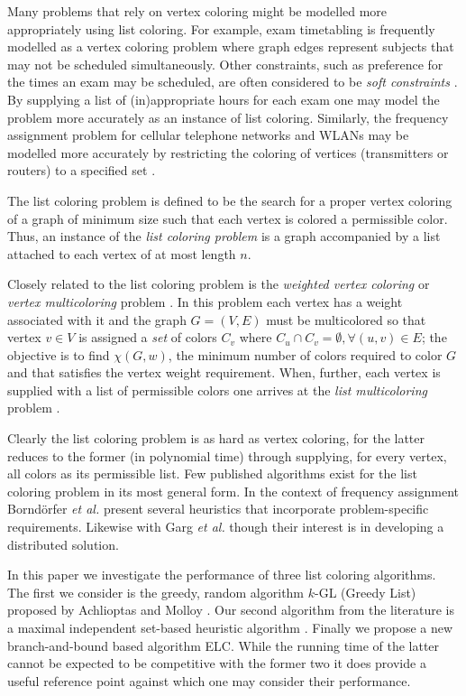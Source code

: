 \documentclass[10pt]{article}
\begin{document}
Many problems that rely on vertex coloring might be modelled more
appropriately using list coloring.  For example, exam timetabling is
frequently modelled as a vertex coloring problem where graph edges
represent subjects that may not be scheduled simultaneously.  Other
constraints, such as preference for the times an exam may be scheduled,
are often considered to be \emph{soft constraints} \cite{QuBur2009}.  By
supplying a list of (in)appropriate hours for each exam one may model
the problem more accurately as an instance of list coloring.  Similarly,
the frequency assignment problem for cellular telephone networks and
\textsc{WLAN}s may be modelled more accurately by restricting the
coloring of vertices (transmitters or routers) to a specified set
\cite{borndorfer-etal-98:FreqAss}.

The list coloring problem is defined to be the search for a proper
vertex coloring of a graph of minimum size such that each vertex is
colored a permissible color.  Thus, an instance of the \emph{list
  coloring problem} is a graph accompanied by a list
  attached to each vertex of at most length
  $n$.

Closely related to the list coloring problem is the \emph{weighted vertex
  coloring} or \emph{vertex multicoloring} problem
\cite{malaguti2010,mehrotra-trick-07:multicol-BP,journals/dmgt/CaramiaF04,NET:NET1028}.
In this problem each vertex has a weight associated with it and the
graph $G = (V, E)$ must be multicolored so that vertex $v \in V$ is assigned a
\emph{set} of colors $C_v$ where $C_u \cap C_v = \emptyset,  \forall (u,v) \in E$;
the objective is to find $\chi(G,w)$, the minimum number of colors required
to color $G$ and that satisfies the vertex weight requirement.  When,
further, each vertex is supplied with a list of permissible colors one
arrives at the \emph{list multicoloring} problem
\cite{DBLP:journals/corr/abs-1202-4842}.

Clearly the list coloring problem is as hard as vertex coloring, for the
latter reduces to the former (in polynomial time) through supplying, for
every vertex, all colors as its permissible list.  Few published
algorithms exist for the list coloring problem in its most general form.
In the context of frequency assignment Borndörfer \emph{et al.} \cite{borndorfer-etal-98:FreqAss}  present
several heuristics that incorporate problem-specific requirements.
Likewise with Garg \emph{et al.}  \cite{Garg96distributedlist} though
their interest is in developing a distributed solution.

In this paper we investigate the performance of three list coloring
algorithms.  The first we consider is the greedy, random algorithm
$k$-GL (Greedy List) proposed by Achlioptas and Molloy
\cite{Achlioptas97theanalysis}.  Our second algorithm from the
literature is a maximal independent set-based heuristic algorithm
\cite{tsouros-satratzemi-05}.  Finally we propose a new
branch-and-bound based algorithm \textsc{ELC}.  While the running time of the
latter cannot be expected to be competitive with the former two it does
provide a useful reference point against which one may consider their
performance.
\end{document}
